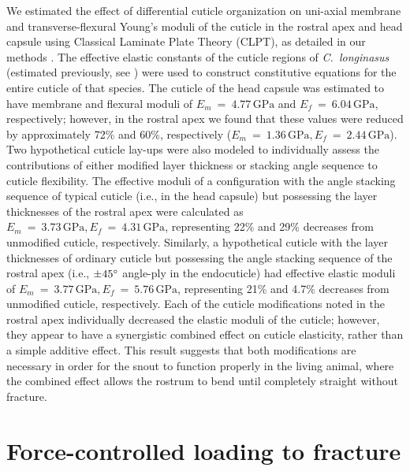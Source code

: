 \documentclass[twocolumn, linenumbers, superscriptaddress, nofootinbib]{revtex4-1}
\begin{document}
		We estimated the effect of differential cuticle organization on uni-axial membrane and transverse-flexural Young's moduli of the cuticle in the rostral apex and head capsule using Classical Laminate Plate Theory (CLPT), as detailed in our methods \cite{Reddy2004, Jones2014}.
		The effective elastic constants of the cuticle regions of \textit{C.~longinasus} (estimated previously, see \cite{Jansen2016}) were used to construct constitutive equations for the entire cuticle of that species.
		The cuticle of the head capsule was estimated to have membrane and flexural moduli of $E_m~=~4.77\,\text{GPa}$ and $E_f~=~6.04\,\text{GPa}$, respectively; however, in the rostral apex we found that these values were reduced by approximately 72\% and 60\%, respectively ($E_m~=~1.36\,\text{GPa}, E_f~=~2.44\,\text{GPa}$).
		Two hypothetical cuticle lay-ups were also modeled to individually assess the contributions of either modified layer thickness or stacking angle sequence to cuticle flexibility.
		The effective moduli of a configuration with the angle stacking sequence of typical cuticle (i.e., in the head capsule) but possessing the layer thicknesses of the rostral apex were calculated as $E_m~=~3.73\,\text{GPa}, E_f~=~4.31\,\text{GPa}$, representing 22\% and 29\% decreases from unmodified cuticle, respectively.
		Similarly, a hypothetical cuticle with the layer thicknesses of ordinary cuticle but possessing the angle stacking sequence of the rostral apex (i.e., $\pm45\degree$ angle-ply in the endocuticle) had effective elastic moduli of $E_m~=~3.77\,\text{GPa}, E_f~=~5.76\,\text{GPa}$, representing 21\% and 4.7\% decreases from unmodified cuticle, respectively.
		Each of the cuticle modifications noted in the rostral apex individually decreased the elastic moduli of the cuticle; however, they appear to have a synergistic combined effect on cuticle elasticity, rather than a simple additive effect.
		This result suggests that both modifications are necessary in order for the snout to function properly in the living animal, where the combined effect allows the rostrum to bend until completely straight without fracture.
		
	\section{Force-controlled loading to fracture}
		
\end{document}
